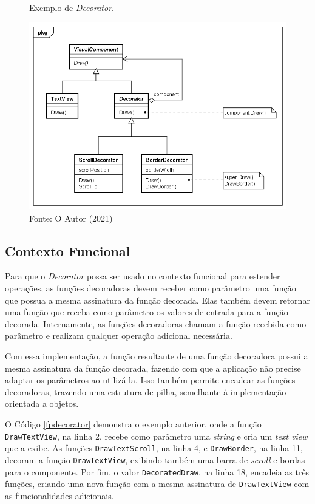\begin{figure}[htb]
	\caption{\label{decorator_exemplo}Exemplo de \textit{Decorator}.}
	\begin{center}
	    \includegraphics[scale=0.5]{5_padroes-contexto-funcional/5.2_estruturais/5.2.4_decorator/decorator_exemplo.png}
	\end{center}
  \caption*{Fonte: O Autor (2021)}
\end{figure}

\subsection*{Contexto Funcional}

Para que o \textit{Decorator} possa ser usado no contexto 
funcional para estender operações, as funções 
decoradoras devem receber como parâmetro uma função 
que possua a mesma assinatura da função decorada. 
Elas também devem retornar uma função que receba 
como parâmetro os valores de entrada para a 
função decorada. Internamente, as funções decoradoras 
chamam a função recebida como parâmetro e realizam 
qualquer operação adicional necessária. 

Com essa implementação, a função resultante de uma 
função decoradora possui a mesma assinatura da função 
decorada, fazendo com que a aplicação não precise adaptar 
os parâmetros ao utilizá-la. Isso também permite 
encadear as funções decoradoras, trazendo uma estrutura de 
pilha, semelhante à implementação orientada a objetos.

O Código \ref{fpdecorator} demonstra o exemplo anterior, onde 
a função \texttt{DrawTextView}, na linha 2, recebe como parâmetro uma 
\textit{string} e cria um \textit{text view} que a exibe. As funções 
\texttt{DrawTextScroll}, na linha 4, e \texttt{DrawBorder}, na linha 11, decoram 
a função \texttt{DrawTextView}, exibindo também uma barra de \textit{scroll} 
e bordas para o componente. Por fim, o valor \texttt{DecoratedDraw}, na 
linha 18, encadeia as três funções, criando uma nova função 
com a mesma assinatura de \texttt{DrawTextView} com as funcionalidades 
adicionais.

